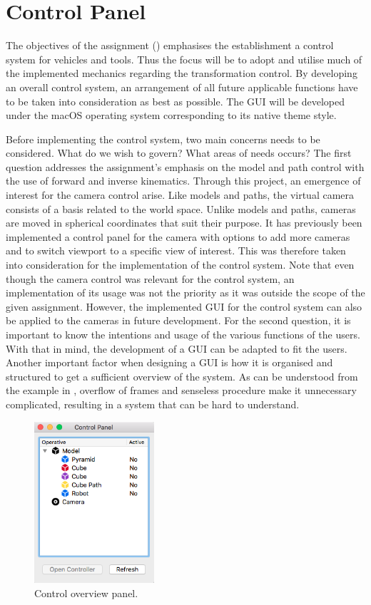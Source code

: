 \section{Control Panel}

The objectives of the assignment () emphasises the establishment a control system for vehicles and tools. Thus the focus will be to adopt and utilise much of the implemented mechanics regarding the transformation control. By developing an overall control system, an arrangement of all future applicable functions have to be taken into consideration as best as possible. The GUI will be developed under the macOS operating system corresponding to its native theme style.

Before implementing the control system, two main concerns needs to be considered. What do we wish to govern? What areas of needs occurs? The first question addresses the assignment's emphasis on the model and path control with the use of forward and inverse kinematics. Through this project, an emergence of interest for the camera control arise. Like models and paths, the virtual camera consists of a basis related to the world space. Unlike models and paths, cameras are moved in spherical coordinates that suit their purpose. It has previously been implemented a control panel for the camera with options to add more cameras and to switch viewport to a specific view of interest. This was therefore taken into consideration for the implementation of the control system. Note that even though the camera control was relevant for the control system, an implementation of its usage was not the priority as it was outside the scope of the given assignment. However, the implemented GUI for the control system can also be applied to the cameras in future development. For the second question, it is important to know the intentions and usage of the various functions of the users. With that in mind, the development of a GUI can be adapted to fit the users. Another important factor when designing a GUI is how it is organised and structured to get a sufficient overview of the system. As can be understood from the example in , overflow of frames and senseless procedure make it unnecessary complicated, resulting in a system that can be hard to understand.

\begin{figure}[ht]
    \centering
    \includegraphics[height=6cm]{images/control_overview.png}
    \caption[Control overview panel]{Control overview panel.}
    \label{fig:ctroverview}
\end{figure}

